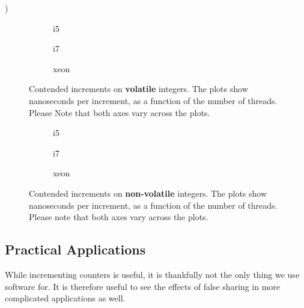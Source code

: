 )

\begin{figure}[hbpt]
	\graphicspath{{plots/}}
	\begin{subfigure}{0.5\textwidth}
		
		\caption{i5}
	\end{subfigure}
	\begin{subfigure}{0.5\textwidth}
		
		\caption{i7}
	\end{subfigure}
	\begin{subfigure}{1\textwidth}
		
		\caption{xeon}
	\end{subfigure}
	\caption{Contended increments on \textbf{volatile} integers. The plots show
	nanoseconds per increment, as a function of the number of threads.
	Please Note that both axes vary across the plots.}
	\label{fig:cont-nob}
\end{figure}

\begin{figure}[hbpt]
	\graphicspath{{plots/}}
	\begin{subfigure}{0.5\textwidth}
		
		\caption{i5}
	\end{subfigure}
	\begin{subfigure}{0.5\textwidth}
		
		\caption{i7}
	\end{subfigure}
	\begin{subfigure}{1\textwidth}
		
		\caption{xeon}
	\end{subfigure}
	\caption{Contended increments on \textbf{non-volatile} integers. The
	plots show nanoseconds per increment, as a function of the number of
	threads. Please note that both axes vary across the plots.}
	\label{fig:uncont-nob}
	\label{fig:cont-nob}
\end{figure}




\subsection{Practical Applications}
While incrementing counters is useful, it is thankfully not the only thing we
use software for. It is therefore useful to see the effects of false sharing in
more complicated applications as well.

